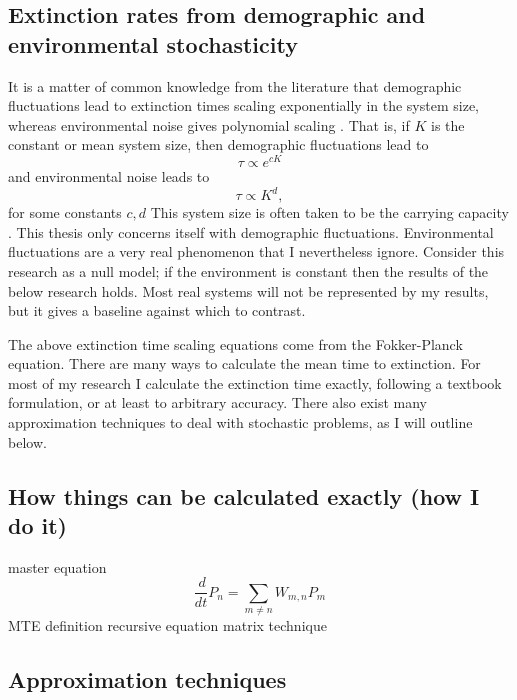 \documentclass[a4paper,11pt]{article}
\numberwithin{equation}{section} %
\begin{document}
\subsection{Extinction rates from demographic and environmental stochasticity}
It is a matter of common knowledge from the literature that demographic fluctuations lead to extinction times scaling exponentially in the system size, whereas environmental noise gives polynomial scaling \cite{Ovaskainen20X6}. 
That is, if $K$ is the constant or mean system size, then demographic fluctuations lead to
\begin{equation}
\tau \propto e^{cK}
\end{equation}
and environmental noise leads to
\begin{equation}
\tau \propto K^d,
\end{equation}
for some constants $c,d$
This system size is often taken to be the carrying capacity \cite{um...}. 
This thesis only concerns itself with demographic fluctuations. 
Environmental fluctuations are a very real phenomenon that I nevertheless ignore. 
Consider this research as a null model; if the environment is constant then the results of the below research holds. 
Most real systems will not be represented by my results, but it gives a baseline against which to contrast. 

The above extinction time scaling equations come from the Fokker-Planck equation. 
There are many ways to calculate the mean time to extinction. 
For most of my research I calculate the extinction time exactly, following a textbook formulation, or at least to arbitrary accuracy. 
There also exist many approximation techniques to deal with stochastic problems, as I will outline below. 

\subsection{How things can be calculated exactly (how I do it)}
master equation
\begin{equation}
\frac{\,d}{dt}P_n = \sum_{m\neq n} W_{m,n}P_m
\end{equation}
MTE definition %
recursive equation
matrix technique

\subsection{Approximation techniques}
\end{document}
